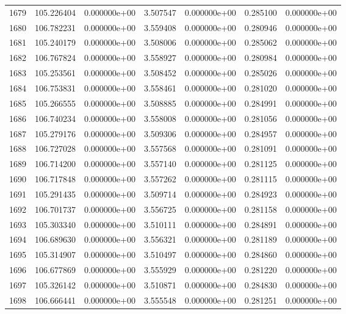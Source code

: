 \begin{tabular}{rrrrrrr}
1679 & 105.226404 &  0.000000e+00 &  3.507547 &  0.000000e+00 &    0.285100 &  0.000000e+00 \\
1680 & 106.782231 &  0.000000e+00 &  3.559408 &  0.000000e+00 &    0.280946 &  0.000000e+00 \\
1681 & 105.240179 &  0.000000e+00 &  3.508006 &  0.000000e+00 &    0.285062 &  0.000000e+00 \\
1682 & 106.767824 &  0.000000e+00 &  3.558927 &  0.000000e+00 &    0.280984 &  0.000000e+00 \\
1683 & 105.253561 &  0.000000e+00 &  3.508452 &  0.000000e+00 &    0.285026 &  0.000000e+00 \\
1684 & 106.753831 &  0.000000e+00 &  3.558461 &  0.000000e+00 &    0.281020 &  0.000000e+00 \\
1685 & 105.266555 &  0.000000e+00 &  3.508885 &  0.000000e+00 &    0.284991 &  0.000000e+00 \\
1686 & 106.740234 &  0.000000e+00 &  3.558008 &  0.000000e+00 &    0.281056 &  0.000000e+00 \\
1687 & 105.279176 &  0.000000e+00 &  3.509306 &  0.000000e+00 &    0.284957 &  0.000000e+00 \\
1688 & 106.727028 &  0.000000e+00 &  3.557568 &  0.000000e+00 &    0.281091 &  0.000000e+00 \\
1689 & 106.714200 &  0.000000e+00 &  3.557140 &  0.000000e+00 &    0.281125 &  0.000000e+00 \\
1690 & 106.717848 &  0.000000e+00 &  3.557262 &  0.000000e+00 &    0.281115 &  0.000000e+00 \\
1691 & 105.291435 &  0.000000e+00 &  3.509714 &  0.000000e+00 &    0.284923 &  0.000000e+00 \\
1692 & 106.701737 &  0.000000e+00 &  3.556725 &  0.000000e+00 &    0.281158 &  0.000000e+00 \\
1693 & 105.303340 &  0.000000e+00 &  3.510111 &  0.000000e+00 &    0.284891 &  0.000000e+00 \\
1694 & 106.689630 &  0.000000e+00 &  3.556321 &  0.000000e+00 &    0.281189 &  0.000000e+00 \\
1695 & 105.314907 &  0.000000e+00 &  3.510497 &  0.000000e+00 &    0.284860 &  0.000000e+00 \\
1696 & 106.677869 &  0.000000e+00 &  3.555929 &  0.000000e+00 &    0.281220 &  0.000000e+00 \\
1697 & 105.326142 &  0.000000e+00 &  3.510871 &  0.000000e+00 &    0.284830 &  0.000000e+00 \\
1698 & 106.666441 &  0.000000e+00 &  3.555548 &  0.000000e+00 &    0.281251 &  0.000000e+00 \\

\end{tabular}
